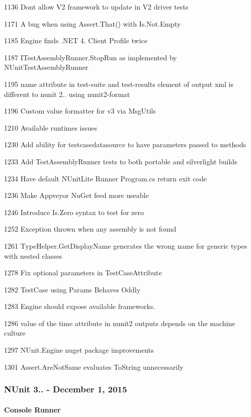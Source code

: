 \begin{DoxyItemize}
\item 1136 Don\textquotesingle{}t allow V2 framework to update in V2 driver tests
\item 1171 A bug when using Assert.\+That() with Is.\+Not.\+Empty
\item 1185 Engine finds .N\+ET 4. Client Profile twice
\item 1187 I\+Test\+Assembly\+Runner.\+Stop\+Run as implemented by N\+Unit\+Test\+Assembly\+Runner
\item 1195 name attribute in test-\/suite and test-\/results element of output xml is different to nunit 2.. using nunit2-\/format
\item 1196 Custom value formatter for v3 via Msg\+Utils
\item 1210 Available runtimes issues
\item 1230 Add ability for testcasedatasource to have parameters passed to methods
\item 1233 Add Test\+Assembly\+Runner tests to both portable and silverlight builds
\item 1234 Have default N\+Unit\+Lite Runner Program.\+cs return exit code
\item 1236 Make Appveyor Nu\+Get feed more useable
\item 1246 Introduce Is.\+Zero syntax to test for zero
\item 1252 Exception thrown when any assembly is not found
\item 1261 Type\+Helper.\+Get\+Display\+Name generates the wrong name for generic types with nested classes
\item 1278 Fix optional parameters in Test\+Case\+Attribute
\item 1282 Test\+Case using Params Behaves Oddly
\item 1283 Engine should expose available frameworks.
\item 1286 value of the time attribute in nunit2 outputs depends on the machine culture
\item 1297 N\+Unit.\+Engine nuget package improvements
\item 1301 Assert.\+Are\+Not\+Same evaluates To\+String unnecessarily
\end{DoxyItemize}

\subsubsection*{N\+Unit 3.. -\/ December 1, 2015}

\paragraph*{Console Runner}


